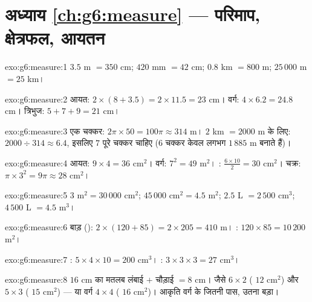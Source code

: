 \section*{अध्याय \ref{ch:g6:measure} --- परिमाप, क्षेत्रफल, आयतन}

\begin{solution}{exo:g6:measure:1}
$3.5$ m $= 350$ cm; \quad $420$ mm $= 42$ cm; \quad
$0.8$ km $= 800$ m; \quad $25\,000$ m $= 25$ km।
\end{solution}

\begin{solution}{exo:g6:measure:2}
आयत: $2 \times (8 + 3.5) = 2 \times 11.5 = 23$ cm।
वर्ग: $4 \times 6.2 = 24.8$ cm।
त्रिभुज: $5 + 7 + 9 = 21$ cm।
\end{solution}

\begin{solution}{exo:g6:measure:3}
एक चक्कर: $2\pi \times 50 = 100\pi \approx 314$ m। $2$ km
$= 2000$ m के लिए: $2000 \div 314 \approx 6.4$, इसलिए $7$ पूरे
चक्कर चाहिए ($6$ चक्कर केवल लगभग $1\,885$ m बनाते हैं)।
\end{solution}

\begin{solution}{exo:g6:measure:4}
आयत: $9 \times 4 = 36$ cm$^2$। वर्ग: $7^2 = 49$ m$^2$।
: $\frac{6 \times 10}{2} = 30$ cm$^2$।
चक्र: $\pi \times 3^2 = 9\pi \approx 28$ cm$^2$।
\end{solution}

\begin{solution}{exo:g6:measure:5}
$3$ m$^2 = 30\,000$ cm$^2$; \quad
$45\,000$ cm$^2 = 4.5$ m$^2$; \quad
$2.5$ L $= 2\,500$ cm$^3$; \quad
$4\,500$ L $= 4.5$ m$^3$।
\end{solution}

\begin{solution}{exo:g6:measure:6}
बाड़ (): $2 \times (120 + 85) = 2 \times 205 = 410$ m।
: $120 \times 85 = 10\,200$ m$^2$।
\end{solution}

\begin{solution}{exo:g6:measure:7}
: $5 \times 4 \times 10 = 200$ cm$^3$। :
$3 \times 3 \times 3 = 27$ cm$^3$।
\end{solution}

\begin{solution}{exo:g6:measure:8}
 $16$ cm का मतलब लंबाई $+$ चौड़ाई $= 8$ cm। जैसे
$6 \times 2$ ( $12$ cm$^2$) और $5 \times 3$ ( $15$ cm$^2$)
--- या वर्ग $4 \times 4$ ( $16$ cm$^2$)। आकृति वर्ग के
जितनी पास,  उतना बड़ा।
\end{solution}

